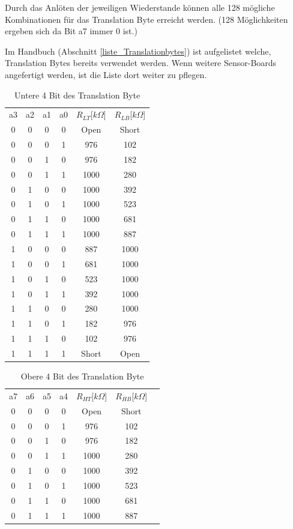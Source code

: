 \noindent Durch das Anlöten der jeweiligen Wiederstande können alle 128 mögliche Kombinationen für das Translation Byte erreicht werden. (128 Möglichkeiten ergeben sich da Bit a7 immer 0 ist.) 


\noindent Im Handbuch (Abschnitt \ref{liste_Translationbytes}) ist aufgelistet welche, Translation Bytes bereits verwendet werden. Wenn weitere Sensor-Boards angefertigt werden, ist die Liste dort weiter zu pflegen.

\begin{table}[!ht]
\caption{Untere 4 Bit des Translation Byte}
\label{TranslationByte_Lower}
\centering
\begin{tabular}{c|c|c|c|c|c}
 a3 & a2 & a1 & a0 & $R_{LT}$[$k\Omega$] & $R_{LB}$[$k\Omega$]\\
 0 & 0 & 0 & 0 & Open & Short \\ 
 0 & 0 & 0 & 1 & 976 & 102\\ 
 0 & 0 & 1 & 0 & 976 & 182\\
 0 & 0 & 1 & 1 & 1000 & 280\\ 
 0 & 1 & 0 & 0 & 1000 & 392\\ 
 0 & 1 & 0 & 1 & 1000 & 523\\ 
 0 & 1 & 1 & 0 & 1000 & 681\\ 
 0 & 1 & 1 & 1 & 1000 & 887\\
 1 & 0 & 0 & 0 & 887 & 1000 \\ 
 1 & 0 & 0 & 1 & 681 & 1000\\ 
 1 & 0 & 1 & 0 & 523 & 1000\\
 1 & 0 & 1 & 1 & 392 & 1000\\ 
 1 & 1 & 0 & 0 & 280 & 1000\\ 
 1 & 1 & 0 & 1 & 182 & 976 \\ 
 1 & 1 & 1 & 0 & 102 & 976\\ 
 1 & 1 & 1 & 1 & Short & Open\\
\end{tabular}
\end{table}

\begin{table}[H]
\caption{Obere 4 Bit des Translation Byte}
\label{TranslationByte_Upper}
\centering
\begin{tabular}{c|c|c|c|c|c|c}
 a7 & a6 & a5 & a4 & $R_{HT}$[$k\Omega$] & $R_{HB}$[$k\Omega$]\\
 0 & 0 & 0 & 0 & Open & Short \\ 
 0 & 0 & 0 & 1 & 976 & 102\\ 
 0 & 0 & 1 & 0 & 976 & 182\\
 0 & 0 & 1 & 1 & 1000 & 280\\ 
 0 & 1 & 0 & 0 & 1000 & 392\\ 
 0 & 1 & 0 & 1 & 1000 & 523\\ 
 0 & 1 & 1 & 0 & 1000 & 681\\ 
 0 & 1 & 1 & 1 & 1000 & 887\\

\end{tabular}
\end{table}

